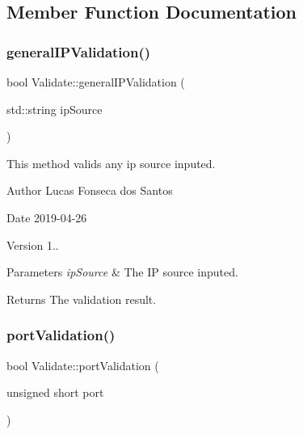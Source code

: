 \subsection{Member Function Documentation}
\mbox{\label{classValidate_a5fc61c0a14b82f79c5a3a9fb7c3616da}} 
\subsubsection{\texorpdfstring{general\+I\+P\+Validation()}{generalIPValidation()}}
{\footnotesize\ttfamily bool Validate\+::general\+I\+P\+Validation (\begin{DoxyParamCaption}\item[{std\+::string}]{ip\+Source }\end{DoxyParamCaption})}

This method valids any ip source inputed. \begin{DoxyAuthor}{Author}
Lucas Fonseca dos Santos 
\end{DoxyAuthor}
\begin{DoxyDate}{Date}
2019-\/04-\/26 
\end{DoxyDate}
\begin{DoxyVersion}{Version}
1..
\end{DoxyVersion}

\begin{DoxyParams}{Parameters}
{\em ip\+Source} & The IP source inputed. \\
\hline
\end{DoxyParams}
\begin{DoxyReturn}{Returns}
The validation result. 
\end{DoxyReturn}
\mbox{\label{classValidate_a6d52d9463a6d4542886c96f43db95faa}} 
\subsubsection{\texorpdfstring{port\+Validation()}{portValidation()}}
{\footnotesize\ttfamily bool Validate\+::port\+Validation (\begin{DoxyParamCaption}\item[{unsigned short}]{port }\end{DoxyParamCaption})}

